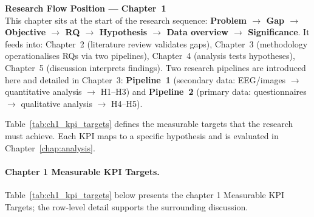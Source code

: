 \medskip
\noindent
\small\textbf{Research Flow Position --- Chapter~1}\\[3pt]
This chapter sits at the start of the research sequence: \textbf{Problem $\to$ Gap $\to$ Objective $\to$ RQ $\to$ Hypothesis $\to$ Data overview $\to$ Significance}.
It feeds into: Chapter~2 (literature review validates gaps), Chapter~3 (methodology operationalises RQs via two pipelines), Chapter~4 (analysis tests hypotheses), Chapter~5 (discussion interprets findings).
Two research pipelines are introduced here and detailed in Chapter~3:
\textbf{Pipeline~1} (secondary data: EEG/images $\to$ quantitative analysis $\to$ H1--H3) and
\textbf{Pipeline~2} (primary data: questionnaires $\to$ qualitative analysis $\to$ H4--H5).


\vspace{0.5em}

\noindent Table~\ref{tab:ch1_kpi_targets} defines the measurable targets that the research must achieve. Each KPI maps to a specific hypothesis and is evaluated in Chapter~\ref{chap:analysis}.

\paragraph{Chapter 1 Measurable KPI Targets.}





\noindent Table~\ref{tab:ch1_kpi_targets} below presents the chapter 1 Measurable KPI Targets; the row-level detail supports the surrounding discussion.

